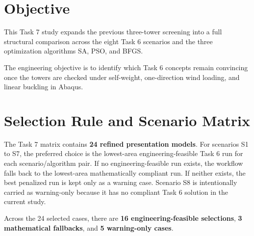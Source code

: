 
\chapter{Objective}


\noindent This Task 7 study expands the previous three-tower screening into a full structural comparison across the eight Task 6 scenarios and the three optimization algorithms SA, PSO, and BFGS.

\noindent The engineering objective is to identify which Task 6 concepts remain convincing once the towers are checked under self-weight, one-direction wind loading, and linear buckling in Abaqus.


\chapter{Selection Rule and Scenario Matrix}


\noindent The Task 7 matrix contains \textbf{24 refined presentation models}. For scenarios S1 to S7, the preferred choice is the lowest-area engineering-feasible Task 6 run for each scenario/algorithm pair. If no engineering-feasible run exists, the workflow falls back to the lowest-area mathematically compliant run. If neither exists, the best penalized run is kept only as a warning case. Scenario S8 is intentionally carried as warning-only because it has no compliant Task 6 solution in the current study.


\noindent Across the 24 selected cases, there are \textbf{16 engineering-feasible selections}, \textbf{3 mathematical fallbacks}, and \textbf{5 warning-only cases}.


